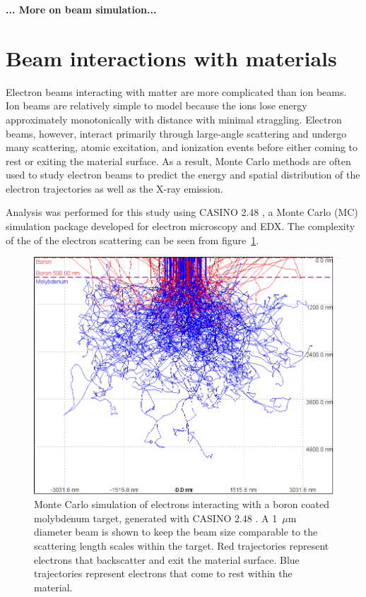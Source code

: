 \documentclass[12pt,letterpaper,final]{article}
\begin{document}
\textbf{... More on beam simulation...}

\section{Beam interactions with materials}
\label{sec:BeamInteractions}
Electron beams interacting with matter are more complicated than ion beams. Ion beams are relatively simple to model because the ions lose energy approximately monotonically with distance with minimal straggling. Electron beams, however, interact primarily through large-angle scattering and undergo many scattering, atomic excitation, and ionization events before either coming to rest or exiting the material surface. As a result, Monte Carlo methods are often used to study electron beams to predict the energy and spatial distribution of the electron trajectories as well as the X-ray emission. 

Analysis was performed for this study using CASINO 2.48 \cite{CASINO}, a Monte Carlo (MC) simulation package developed for electron microscopy and EDX. The complexity of the of the electron scattering can be seen from figure~\ref{fig:ElectronsInTarget}.

\begin{figure}[!h]
 \centering
  \includegraphics[width=\columnwidth]{figures/ElectronsInTargetWide.png}
 \caption{Monte Carlo simulation of electrons interacting with a boron coated molybdenum target, generated with CASINO 2.48 \cite{CASINO}. A 1~$\mu$m diameter beam is shown to keep the beam size comparable to the scattering length scales within the target. Red trajectories represent electrons that backscatter and exit the material surface. Blue trajectories represent electrons that come to rest within the material.}
\label{fig:ElectronsInTarget}
\end{figure}
\end{document}
